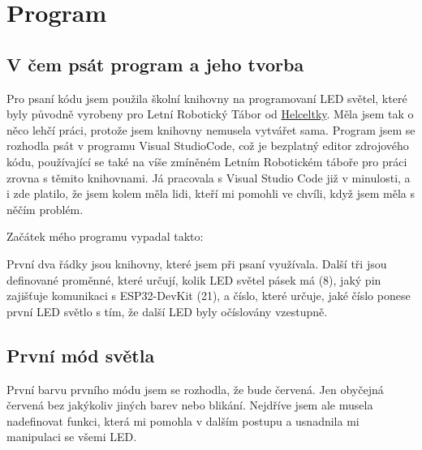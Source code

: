 \chapter{Program}

\section{V čem psát program a jeho tvorba}

Pro psaní kódu jsem použila školní knihovny na programovaní LED světel, které byly původně vyrobeny pro Letní Robotický Tábor od 
 \href{https://helceletka.cz/tabory/#id=5357}{Helceltky}. Měla jsem tak o něco lehčí práci, protože jsem knihovny nemusela vytvářet sama. Program jsem se rozhodla psát v programu Visual StudioCode,\cite{Visualstudio} což je bezplatný editor zdrojového kódu, používající se také na víše zmíněném Letním Robotickém táboře pro práci zrovna s těmito knihovnami. Já pracovala s Visual Studio Code již v minulosti, a i zde platilo, že jsem kolem měla lidi, kteří mi pomohli ve chvíli, když jsem měla s něčím problém. 

Začátek mého programu vypadal takto:




%



První dva řádky jsou knihovny, které jsem při psaní využívala. Další tři jsou definované proměnné, které určují, kolik LED světel pásek má (8), jaký pin zajišťuje komunikaci s ESP32-DevKit (21), a číslo, které určuje, jaké číslo ponese první LED světlo s tím, že další LED byly očíslovány vzestupně.

\newpage

\section{První mód světla}
První barvu prvního módu jsem se rozhodla, že bude červená. Jen obyčejná červená bez jakýkoliv jiných barev nebo blikání. Nejdříve jsem ale musela nadefinovat funkci, která mi pomohla v dalším postupu a usnadnila mi manipulaci se všemi LED. 

%



